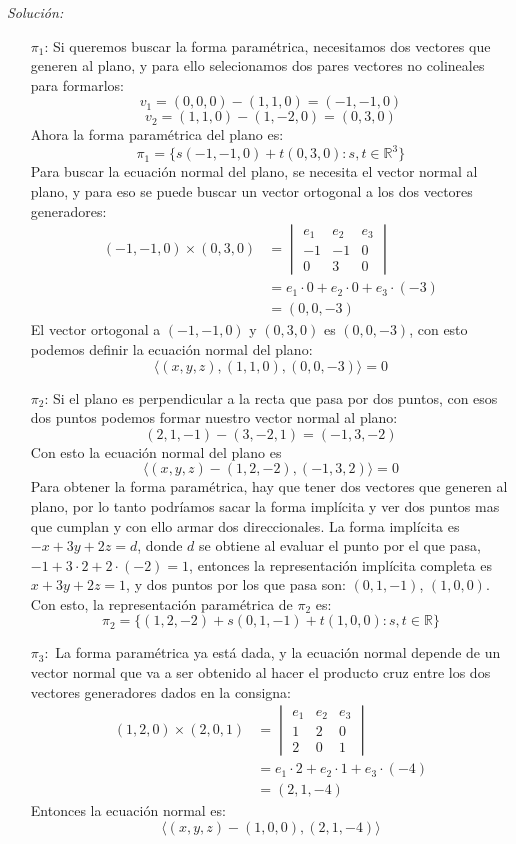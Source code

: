 \documentclass{article}
\newenvironment{solution}
    {\textit{Solución:}}
    {}
\begin{document}
\begin{solution}
\begin{itemize}
\item[$\pi_1$:] Si queremos buscar la forma paramétrica, necesitamos dos vectores que generen al plano, y para ello selecionamos dos pares vectores no colineales para formarlos:
\[
v_1 = (0,0,0) - (1,1,0) = (-1,-1,0)
\]\[
v_2 = (1,1,0) - (1,-2,0) = (0,3,0)
\]
Ahora la forma paramétrica del plano es:
\[
\pi_1 = \{ s(-1,-1,0) + t(0,3,0) : s,t \in \mathbb{R}^3 \}
\]
Para buscar la ecuación normal del plano, se necesita el vector normal al plano, y para eso se puede buscar un vector ortogonal a los dos vectores generadores:
\[
\begin{aligned}
(-1,-1,0) \times (0,3,0) &=
\begin{vmatrix}
e_1 & e_2 & e_3 \\
-1 & -1 & 0 \\
0 & 3 & 0
\end{vmatrix} \\
&= e_1 \cdot 0 + e_2 \cdot 0 + e_3 \cdot (-3) \\
&= (0,0,-3)
\end{aligned}
\]
El vector ortogonal a $(-1,-1,0)$ y $(0,3,0)$ es $(0,0,-3)$, con esto podemos definir la ecuación normal del plano:
\[
\langle (x,y,z), (1,1,0), (0,0,-3) \rangle = 0
\]
\item[$\pi_2$:] Si el plano es perpendicular a la recta que pasa por dos puntos, con esos dos puntos podemos formar nuestro vector normal al plano:
\[
(2,1,-1)- (3,-2,1) = (-1,3,-2)
\]
Con esto la ecuación normal del plano es
\[
\langle (x,y,z) - (1,2,-2), (-1,3,2) \rangle = 0
\]
Para obtener la forma paramétrica, hay que tener dos vectores que generen al plano, por lo tanto podríamos sacar la forma implícita y ver dos puntos mas que cumplan y con ello armar dos direccionales. La forma implícita es $-x+3y+2z = d$, donde $d$ se obtiene al evaluar el punto por el que pasa, $-1+3\cdot 2+2\cdot (-2) = 1$, entonces la representación implícita completa es $x+3y+2z = 1$, y dos puntos por los que pasa son: $(0,1,-1)$, $(1,0,0)$.
Con esto, la representación paramétrica de $\pi_2$ es:
\[
\pi_2 = \{ (1,2,-2) + s(0,1,-1) + t(1,0,0) : s,t \in \mathbb{R} \}
\]
\item[$\pi_3:$] La forma paramétrica ya está dada, y la ecuación normal depende de un vector normal que va a ser obtenido al hacer el producto cruz entre los dos vectores generadores dados en la consigna:
\[
\begin{aligned}
(1,2,0) \times (2,0,1) &=
\begin{vmatrix}
e_1 & e_2 & e_3 \\
1 & 2 & 0 \\
2 & 0 & 1
\end{vmatrix} \\
&= e_1 \cdot 2 + e_2 \cdot 1 + e_3 \cdot (-4) \\
&= (2,1,-4)
\end{aligned}
\]
Entonces la ecuación normal es:
\[
\langle (x,y,z) - (1,0,0), (2,1,-4) \rangle
\]
\end{itemize}
\end{solution}
\end{document}
